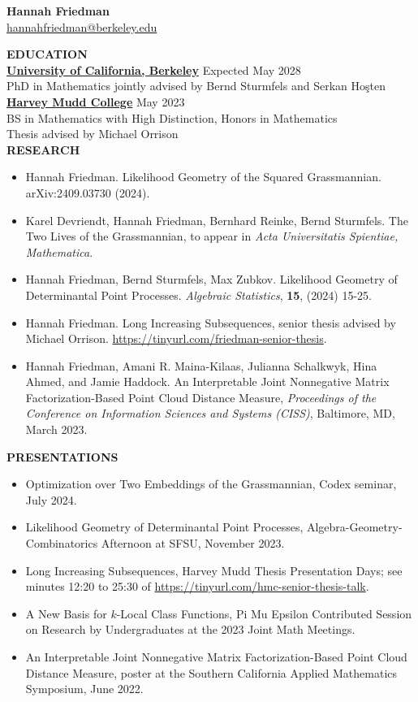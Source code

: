 \documentclass[11pt]{article}
\newcommand{\hdr}[1]{\textcolor{blue(ryb)}{\textbf{#1}}}
\begin{document}
\begin{center}
\hdr{\Large{Hannah Friedman}}\\
\url{hannahfriedman@berkeley.edu}\\
\end{center}
\medskip
\raggedright
\hdr{EDUCATION}\\
\textbf{\underline{University of California, Berkeley}} \hfill Expected May 2028\\
PhD in Mathematics jointly advised by Bernd Sturmfels and Serkan Ho\c{s}ten\\
\textbf{\underline{Harvey Mudd College}} \hfill May 2023\\
BS in Mathematics with High Distinction, Honors in Mathematics\\
Thesis advised by Michael Orrison\\
\medskip
\hdr{RESEARCH}\\
\begin{itemize}
\item Hannah Friedman.
  Likelihood Geometry of the Squared Grassmannian. arXiv:2409.03730 (2024).
  \item Karel Devriendt, Hannah Friedman, Bernhard Reinke, Bernd Sturmfels.
    The Two Lives of the Grassmannian, to appear in \textit{Acta Universitatis Spientiae, Mathematica}. 
\item Hannah Friedman, Bernd Sturmfels, Max Zubkov.
  Likelihood Geometry of Determinantal Point Processes.
  \emph{Algebraic Statistics}, \textbf{15}, (2024) 15-25.
\item Hannah Friedman. Long Increasing Subsequences, senior thesis advised by Michael Orrison. \url{https://tinyurl.com/friedman-senior-thesis}.
\item Hannah Friedman, Amani R. Maina-Kilaas, Julianna Schalkwyk, Hina Ahmed, and Jamie Haddock. 
  An Interpretable Joint Nonnegative Matrix Factorization-Based Point Cloud Distance Measure, \emph{Proceedings of the Conference on Information Sciences and Systems (CISS)}, Baltimore, MD, March 2023.
\end{itemize}
\hdr{PRESENTATIONS}\\
\begin{itemize}
\item  Optimization over Two Embeddings of the Grassmannian, Codex seminar, July 2024. 
\item Likelihood Geometry of Determinantal Point Processes, Algebra-Geometry-Combinatorics Afternoon at SFSU, November 2023.
\item Long Increasing Subsequences, Harvey Mudd Thesis Presentation Days; see minutes 12:20 to 25:30 of \url{https://tinyurl.com/hmc-senior-thesis-talk}.
\item A New Basis for $k$-Local Class Functions, Pi Mu Epsilon Contributed Session on Research by Undergraduates at the 2023 Joint Math Meetings.
\item An Interpretable Joint Nonnegative Matrix Factorization-Based Point Cloud Distance Measure, poster at the Southern California Applied Mathematics Symposium, June 2022.
\end{itemize}
\end{document}
